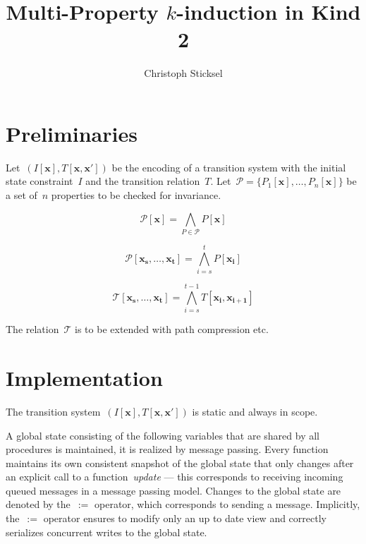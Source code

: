 \documentclass[12pt]{article}
\renewcommand{\textproc}{\textsl}
\renewcommand{\vec}[1]{\mathbf{#1}}            %
\begin{document}
\title{Multi-Property $k$-induction in Kind 2}

\author{Christoph Sticksel}
\maketitle

\section{Preliminaries}
\label{sec:prelim}


Let~${(I[\vec x], T[\vec x, \vec x'])}$ be the encoding of a transition system with the initial state constraint~$I$ and the transition relation~$T$. Let~${\mathcal{P} = \{ P_1[\vec x], \dotsc, P_n[\vec x] \}}$ be a set of~$n$ properties to be checked for invariance.

\[ \mathcal{P}[\vec{x}] = \bigwedge_{P\in\mathcal{P}} P[\vec{x}] \]

\[ \mathcal{P}[\vec{x_s},\dotsc,\vec{x_t}] = \bigwedge_{i=s}^t P[\vec{x_i}] \]

\[ \mathcal{T}[\vec{x_s},\dotsc,\vec{x_t}] = \bigwedge_{i=s}^{t-1}  T[\vec{x_i},\vec{x_{i+1}}]  \]


The relation~$\mathcal{T}$ is to be extended with path compression etc.

\section{Implementation}
\label{sec:impl}

The transition system~${(I[\vec x], T[\vec x, \vec x'])}$ is static and always in scope.

A global state consisting of the following variables that are shared by all procedures is maintained, it is realized by message passing. Every function maintains its own consistent snapshot of the global state that only changes after an explicit call to a function~\textproc{update} --- this corresponds to receiving incoming queued messages in a message passing model. Changes to the global state are denoted by the~$:=$ operator, which corresponds to sending a message. Implicitly, the~$:=$ operator ensures to modify only an up to date view and correctly serializes concurrent writes to the global state.
\end{document}
